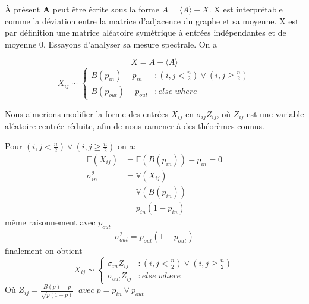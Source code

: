 À présent \textbf{A} peut être écrite sous la forme $A = \langle A \rangle + X$.
X est interprétable comme la déviation entre la matrice d'adjacence du graphe et sa moyenne.
X est par définition une matrice aléatoire symétrique à entrées indépendantes et de moyenne 0.
Essayons d'analyser sa mesure spectrale.
On a 

\begin{equation}
X = A - \langle A \rangle\nonumber
\end{equation}
\begin{equation}
	X_{ij} \sim \left\{
	\begin{array}{lr}
		B(p_{in}) - p_{in} & : (i,j < \frac{n}{2}) \lor (i,j \ge \frac{n}{2}) \\
		B(p_{out}) - p_{out} & : else \; where
	\end{array}
\right.\nonumber
\end{equation}

Nous aimerions modifier la forme des entrées $X_{ij}$ en $\sigma_{ij} Z_{ij}$, où $Z_{ij}$ est une variable aléatoire centrée réduite, afin de nous ramener à des théorèmes connus.

Pour $(i,j < \frac{n}{2}) \lor (i,j \ge \frac{n}{2}) $ on a:
\begin{align*}
\mathbb{E}(X_{ij}) &= \mathbb{E}(B(p_{in}))- p_{in} = 0\\
\sigma_{in}^2 &= \mathbb{V}(X_{ij}) \\ 
			  &= \mathbb{V}(B(p_{in})) \\
			  &= p_{in} (1 - p_{in})
\end{align*}
même raisonnement avec $p_{out}$ 
\begin{align*}
\sigma_{out}^2 =  p_{out} (1 - p_{out})
\end{align*}
finalement on obtient 
\begin{equation}
	X_{ij} \sim \left\{
	\begin{array}{lr}
		\sigma_{in} Z_{ij} & : (i,j < \frac{n}{2}) \lor (i,j \ge \frac{n}{2}) \\
		\sigma_{out} Z_{ij} & : else \; where
	\end{array}
\right.\nonumber
\end{equation}
Où $Z_{ij} = \frac{B(p) - p}{\sqrt{p(1-p)}} \;\;avec \; p = p_{in} \lor p_{out}$\\

